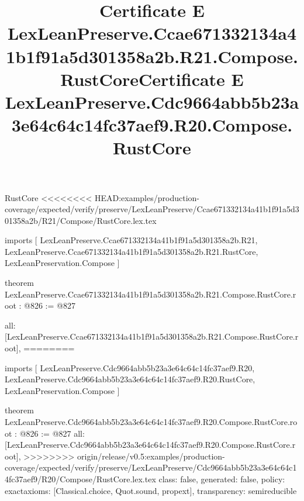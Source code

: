 \begin{lexlean}{RustCore}
<<<<<<<< HEAD:examples/production-coverage/expected/verify/preserve/LexLeanPreserve/Ccae671332134a41b1f91a5d301358a2b/R21/Compose/RustCore.lex.tex
\title{Certificate E LexLeanPreserve.Ccae671332134a41b1f91a5d301358a2b.R21.Compose.RustCore}
\begin{coremodule}
imports [
  LexLeanPreserve.Ccae671332134a41b1f91a5d301358a2b.R21,
  LexLeanPreserve.Ccae671332134a41b1f91a5d301358a2b.R21.RustCore,
  LexLeanPreservation.Compose
]

theorem LexLeanPreserve.Ccae671332134a41b1f91a5d301358a2b.R21.Compose.RustCore.root : @826 := @827 {
  all: [LexLeanPreserve.Ccae671332134a41b1f91a5d301358a2b.R21.Compose.RustCore.root],
========
\title{Certificate E LexLeanPreserve.Cdc9664abb5b23a3e64c64c14fc37aef9.R20.Compose.RustCore}
\begin{coremodule}
imports [
  LexLeanPreserve.Cdc9664abb5b23a3e64c64c14fc37aef9.R20,
  LexLeanPreserve.Cdc9664abb5b23a3e64c64c14fc37aef9.R20.RustCore,
  LexLeanPreservation.Compose
]

theorem LexLeanPreserve.Cdc9664abb5b23a3e64c64c14fc37aef9.R20.Compose.RustCore.root : @826 := @827 {
  all: [LexLeanPreserve.Cdc9664abb5b23a3e64c64c14fc37aef9.R20.Compose.RustCore.root],
>>>>>>>> origin/release/v0.5:examples/production-coverage/expected/verify/preserve/LexLeanPreserve/Cdc9664abb5b23a3e64c64c14fc37aef9/R20/Compose/RustCore.lex.tex
  class: false,
  generated: false,
  policy: exact{axioms: [Classical.choice, Quot.sound, propext]},
  transparency: semireducible
}


\end{coremodule}}
\end{coremodule}
\end{lexlean}
